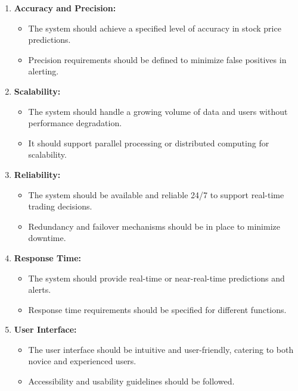 \documentclass[./main.tex]{subfiles}
\begin{document}
\begin{enumerate}[label=\roman*.]
  \item \textbf{Accuracy and Precision:}
    \begin{itemize}
      \item The system should achieve a specified level of accuracy in stock price predictions.
      \item Precision requirements should be defined to minimize false positives in alerting.
    \end{itemize}
    
  \item \textbf{Scalability:}
    \begin{itemize}
      \item The system should handle a growing volume of data and users without performance degradation.
      \item It should support parallel processing or distributed computing for scalability.
    \end{itemize}
    
  \item \textbf{Reliability:}
    \begin{itemize}
      \item The system should be available and reliable 24/7 to support real-time trading decisions.
      \item Redundancy and failover mechanisms should be in place to minimize downtime.
    \end{itemize}
    
  \item \textbf{Response Time:}
    \begin{itemize}
      \item The system should provide real-time or near-real-time predictions and alerts.
      \item Response time requirements should be specified for different functions.
    \end{itemize}
    
  \item \textbf{User Interface:}
    \begin{itemize}
      \item The user interface should be intuitive and user-friendly, catering to both novice and experienced users.
      \item Accessibility and usability guidelines should be followed.
    \end{itemize}
 \end{enumerate}
\end{document}
